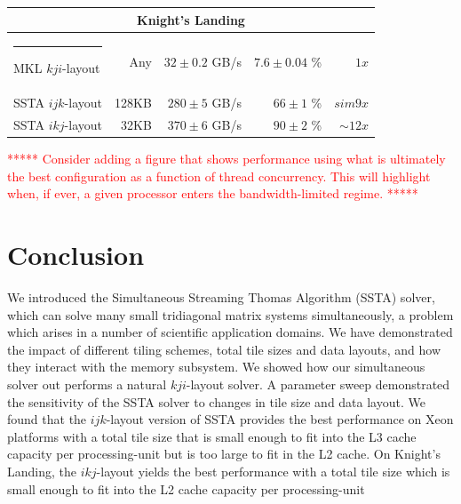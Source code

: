 \documentclass{sig-alternate-05-2015}
\makeatletter
\newcommand{\thickhline}{%
    \noalign {\ifnum 0=`}\fi \hrule height 1pt
    \futurelet \reserved@a \@xhline
}
\newcommand{\fix}[1]{\textcolor{red}{#1}}
\makeatother
\begin{document}
\begin{table}[t]
\begin{tabular}{|l|r|r|r|r|}
    \multicolumn{5}{c}{\rule{0pt}{2.25ex} \textbf{Knight's Landing}} \\ \hline \thickhline
    MKL \(kji\)-layout  &   Any &\(32 \pm 0.2\) GB/s&\(7.6 \pm 0.04\) \%& \(1x\) \\ \hline
    SSTA \(ijk\)-layout & 128KB &\(280 \pm 5\) GB/s&\(66 \pm 1\) \%& \(sim 9x\) \\ \hline
    SSTA \(ikj\)-layout &  32KB &\(370 \pm 6\) GB/s&\(90 \pm 2\) \%& \(\sim 12x\) \\ \hline
  \end{tabular}
  \label{tab:results:summary}
\end{table}

\fix{***** Consider adding a figure that shows performance using what is ultimately the best configuration as a function of thread concurrency.  This will highlight when, if ever, a given processor enters the bandwidth-limited regime. *****}

\section{Conclusion}
\label{sec:conclusion}


We introduced the Simultaneous Streaming Thomas Algorithm (SSTA) solver, which
  can solve many small tridiagonal matrix systems simultaneously, a
  problem which arises in a number of scientific application domains.
We have demonstrated the impact of different tiling schemes, total tile sizes
  and data layouts, and how they interact with the memory subsystem.
We showed how our simultaneous solver out performs a natural \(kji\)-layout
  solver.
A parameter sweep demonstrated the sensitivity of the SSTA solver to changes in
  tile size and data layout.
We found that the \(ijk\)-layout version of SSTA provides the best performance
  on Xeon platforms with a total tile size that is small enough to fit into the
  L3 cache capacity per processing-unit but is too large to fit in the L2 cache.
On Knight's Landing, the \(ikj\)-layout yields the best performance with a
  total tile size which is small enough to fit into the L2 cache capacity per
  processing-unit
\end{document}

